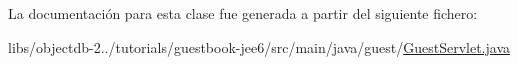 La documentación para esta clase fue generada a partir del siguiente fichero\+:\begin{DoxyCompactItemize}
\item 
libs/objectdb-\/2../tutorials/guestbook-\/jee6/src/main/java/guest/\mbox{\hyperlink{guestbook-jee6_2src_2main_2java_2guest_2_guest_servlet_8java}{Guest\+Servlet.\+java}}\end{DoxyCompactItemize}
